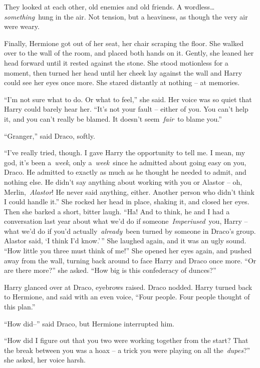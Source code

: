 They looked at each other, old enemies and old friends. A
wordless\ldots{}\emph{something}~hung in the air. Not tension, but a
heaviness, as though the very air were weary.

Finally, Hermione got out of her seat, her chair scraping the floor. She
walked over to the wall of the room, and placed both hands on it.
Gently, she leaned her head forward until it rested against the stone.
She stood motionless for a moment, then turned her head until her cheek
lay against the wall and Harry could see her eyes once more. She stared
distantly at nothing -- at memories.

``I'm not sure what to do. Or what to feel,'' she said. Her voice was so
quiet that Harry could barely hear her. ``It's not your fault -- either
of you. You can't help it, and you can't really be blamed. It doesn't
seem~\emph{fair}~to blame you.''

``Granger,'' said Draco, softly.

``I've really tried, though. I gave Harry the opportunity to tell me. I
mean, my god, it's been a~\emph{week}, only a~\emph{week}~since he
admitted about going easy on you, Draco. He admitted to exactly as much
as he thought he needed to admit, and nothing else. He didn't say
anything about working with you or Alastor -- oh,
Merlin,~\emph{Alastor}! He never said anything, either. Another person
who didn't think I could handle it.'' She rocked her head in place,
shaking it, and closed her eyes. Then she barked a short, bitter laugh.
``Ha! And to think, he and I had a conversation last year about what
we'd do if someone~\emph{Imperiused}~you, Harry -- what we'd do if you'd
actually~\emph{already}~been turned by someone in Draco's group. Alastor
said, `I think I'd know.'\,'' She laughed again, and it was an ugly
sound. ``How little you three must think of me!'' She opened her eyes
again, and pushed away from the wall, turning back around to face Harry
and Draco once more. ``Or are there more?'' she asked. ``How big is this
confederacy of dunces?''

Harry glanced over at Draco, eyebrows raised. Draco nodded. Harry turned
back to Hermione, and said with an even voice, ``Four people. Four
people thought of this plan.''

``How did--'' said Draco, but Hermione interrupted him.

``How did I figure out that you two were working together from the
start? That the break between you was a hoax -- a trick you were playing
on all the~\emph{dupes}?'' she asked, her voice harsh.

